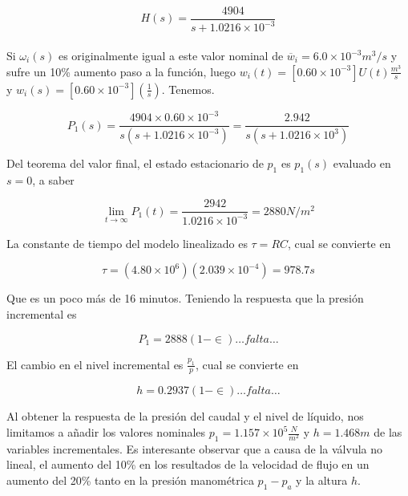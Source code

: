 \documentclass[a4paper,12pt,twoside]{proyectotanquesecci}
\begin{document}
\begin{equation}
H\left( s\right) =\frac {4904}{s+1.0216\times 10^{-3}}
\end{equation} \\

Si $\omega_{i}(s)$ es originalmente igual a este valor nominal de $\overline {w}_{i}=6.0\times 10^{-3}m^{3}/s$ y sufre un 10\% aumento paso a la función, luego $w_{i}\left( t\right) =\left[ 0.60\times 10^{-3}\right] U\left( t\right) \frac {m^{3}}{s}$ y $w_{i}\left( s\right) =\left[ 0.60\times 10^{-3}\right] \left( \frac {1}{s}\right)$. Tenemos.

\begin{equation}
P_{1}\left( s\right) =\frac {4904\times 0.60\times 10^{-3}}{s\left( s+1.0216\times 10^{-3}\right) }
=\frac {2.942}{s\left( s+1.0216\times 10^{3}\right) }
\end{equation}

Del teorema del valor final, el estado estacionario de $p_{1}$ es $p_{1}(s)$ evaluado en $s=0$, a saber

\begin{equation}
\lim _{t\rightarrow \infty }P_{1}\left( t\right) =\frac {2942}{1.0216\times 10^{-3}}=2880N/m^{2}
\end{equation}

La constante de tiempo del modelo linealizado es $\tau = RC$, cual se convierte en 

\begin{equation}
\tau =\left( 4.80\times 10^{6}\right) \left( 2.039\times 10^{-4}\right) =978.7s
\end{equation}

Que es un poco más de 16 minutos. Teniendo la respuesta que la presión incremental es

\begin{equation}
P_{1}=2888\left( 1-\in \right) \ldots falta\ldots
\end{equation}

El cambio en el nivel incremental es $\frac{p_{1}}{p}$, cual se convierte en 

\begin{equation}
h=0.2937\left( 1-\in \right) \ldots falta\ldots 
\end{equation}

Al obtener la respuesta de la presión del caudal y el nivel de líquido, nos limitamos a añadir los valores nominales $p_{1}=1.157\times 10^{5}\frac {N}{m^{2}}$ y $h=1.468m$ de las variables incrementales. Es interesante observar que a causa de la válvula no lineal, el aumento del 10\% en los resultados de la velocidad de flujo en un aumento del 20\% tanto en la presión manométrica $p_{1}-p_{a}$ y la altura $h$. \\
\end{document}
